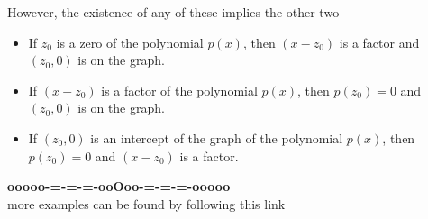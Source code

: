 \documentclass{ximera}
\begin{document}
However, the existence of any of these implies the other two






\begin{itemize}

\item If $z_0$ is a zero of the polynomial $p(x)$, then $(x-z_0)$ is a factor and $(z_0,0)$ is on the graph.


\item If $(x-z_0)$ is a factor of the polynomial $p(x)$, then $p(z_0)=0$ and $(z_0,0)$ is on the graph.


\item If $(z_0,0)$ is an intercept of the graph of the polynomial $p(x)$, then $p(z_0)=0$ and $(x-z_0)$ is a factor.

\end{itemize}












\begin{onlineOnly}
\begin{center}
\textbf{\textcolor{green!50!black}{ooooo-=-=-=-ooOoo-=-=-=-ooooo}} \\

more examples can be found by following this link\\ 

\end{center}
\end{onlineOnly}
\end{document}
